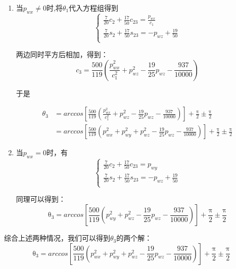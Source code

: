 \begin{enumerate}
    \item 当$p_{wx} \neq 0$时,将$\theta_1$代入方程组得到
    \begin{equation}
        \left\{ \begin{array}{c}	\frac{7}{20}c_2+\frac{17}{50}c_{23}=\frac{p_{wx}}{c_1}\\	\frac{7}{20}s_2+\frac{17}{50}s_{23}=-p_{wz}+\frac{19}{50}\\\end{array} \right. 
    \end{equation}


两边同时平方后相加，得到：
\begin{equation}
    c_3=\frac{500}{119}\left( \frac{p_{wx}^{2}}{c_{1}^{2}}+p_{wz}^{2}-\frac{19}{25}p_{wz}-\frac{937}{10000} \right) 
\end{equation}

于是

\begin{equation}
    \begin{aligned}
        \theta_3&=arccos\left[ \frac{500}{119}\left( \frac{p_{wx}^{2}}{c_{1}^{2}}+p_{wz}^{2}-\frac{19}{25}p_{wz}-\frac{937}{10000} \right) \right] +\frac{\mathrm{\pi}}{2}\pm \frac{\mathrm{\pi}}{2}\\
        &=arccos\left[ \frac{500}{119}\left( p_{wx}^2+p_{wy}^2+p_{wz}^{2}-\frac{19}{25}p_{wz}-\frac{937}{10000} \right) \right] +\frac{\mathrm{\pi}}{2}\pm \frac{\mathrm{\pi}}{2}
    \end{aligned}
\end{equation}

    \item 当$p_{wx}=0$时，有
    \begin{equation}
        \left\{ \begin{array}{c}	\mathrm{    }\frac{7}{20}c_2+\frac{17}{50}c_{23}=p_{wy}\\	\frac{7}{20}s_2+\frac{17}{50}s_{23}=-p_{wz}+\frac{19}{50}\\\end{array} \right.
    \end{equation}

    同理可以得到：
    \begin{equation}
        \mathrm{\theta}_3=arccos\left[ \frac{500}{119}\left( p_{wy}^{2}+p_{wz}^{2}-\frac{19}{25}p_{wz}-\frac{937}{10000} \right) \right] +\frac{\mathrm{\pi}}{2}\pm \frac{\mathrm{\pi}}{2}
    \end{equation}

\end{enumerate}
    综合上述两种情况，我们可以得到$\theta_3$的两个解：
    \begin{equation}
        \mathrm{\theta}_3=arccos\left[ \frac{500}{119}\left( p_{wx}^{2}+p_{wy}^{2}+p_{wz}^{2}-\frac{19}{25}p_{wz}-\frac{937}{10000} \right) \right] +\frac{\mathrm{\pi}}{2}\pm \frac{\mathrm{\pi}}{2}
    \end{equation}

